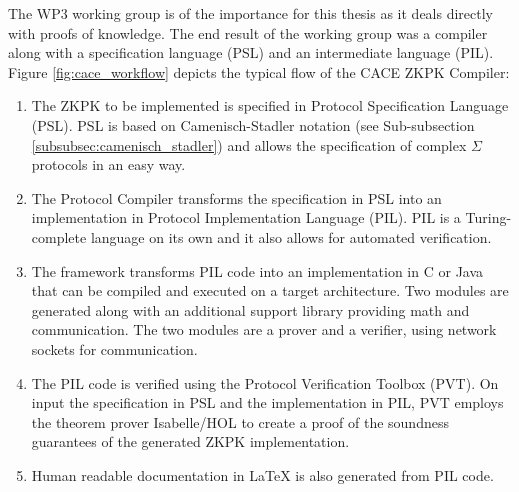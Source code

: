 The WP3 working group is of the importance for this thesis as it deals
directly with proofs of knowledge. The end result of the working group
was a compiler along with a specification language (PSL) and an
intermediate language (PIL). Figure \ref{fig:cace_workflow} depicts the
typical flow of the CACE ZKPK Compiler:
\begin{enumerate}
\item The ZKPK to be implemented is specified in Protocol
  Specification Language (PSL). PSL is based on Camenisch-Stadler
  notation (see Sub-subsection \ref{subsubsec:camenisch_stadler}) and
  allows the specification of complex $\Sigma$ protocols in an easy way.

\item The Protocol Compiler transforms the specification in PSL into
  an implementation in Protocol Implementation Language (PIL). PIL is
  a Turing-complete language on its own and it also allows for
  automated verification.

\item The framework transforms PIL code into an implementation in C or
  Java that can be compiled and executed on a target architecture. Two
  modules are generated along with an additional support library
  providing math and communication. The two modules are a prover and a
  verifier, using network sockets for communication.

\item The PIL code is verified using the Protocol Verification Toolbox
  (PVT). On input the specification in PSL and the implementation in
  PIL, PVT employs the theorem prover Isabelle/HOL \cite{isabelle_hol}
  to create a proof of the soundness guarantees of the generated ZKPK
  implementation.

\item  Human readable documentation in \LaTeX{} is also generated from PIL code.

\end{enumerate}


